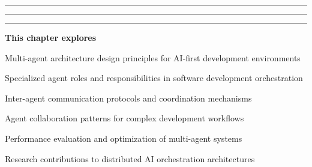 \vspace{0.5cm}

\begin{center}
\textcolor{brandAccent}{
\rule{2cm}{0.8pt} \quad
\raisebox{-0.2ex}{\Large$\star$} \quad
\rule{4cm}{0.8pt} \quad
\raisebox{-0.2ex}{\Large$\star$} \quad
\rule{2cm}{0.8pt}
}
\end{center}

\vspace{2cm}

\begin{tcolorbox}[
    enhanced,
    colback=white,
    colframe=brandPrimary!40,
    boxrule=1pt,
    arc=12pt,
    drop shadow={brandPrimary!20},
    left=1.5cm,
    right=1.5cm,
    top=1.2cm,
    bottom=1.2cm,
    before upper={\parindent0pt}
]
\begin{center}
{\Large\textbf{\textcolor{brandPrimary}{This chapter explores}}}
\end{center}

\vspace{0.8cm}

\begin{compactlist}
    \item {\large Multi-agent architecture design principles for AI-first development environments}
    \item {\large Specialized agent roles and responsibilities in software development orchestration}
    \item {\large Inter-agent communication protocols and coordination mechanisms}
    \item {\large Agent collaboration patterns for complex development workflows}
    \item {\large Performance evaluation and optimization of multi-agent systems}
    \item {\large Research contributions to distributed AI orchestration architectures}
\end{compactlist}
\end{tcolorbox}

\clearpage
